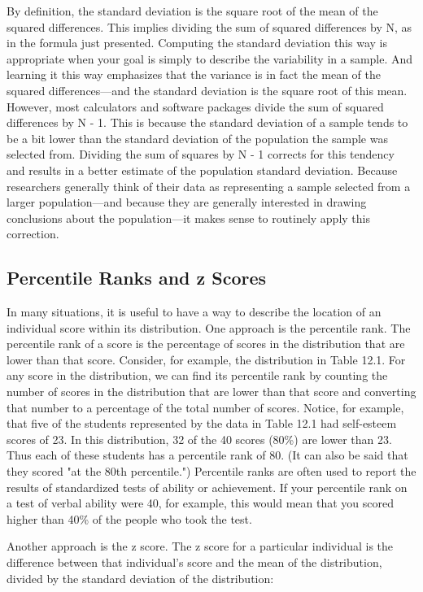 By definition, the standard deviation is the square root of the mean of the squared differences. This implies dividing the sum of squared differences by N, as in the formula just presented. Computing the standard deviation this way is appropriate when your goal is simply to describe the variability in a sample. And learning it this way emphasizes that the variance is in fact the mean of the squared differences---and the standard deviation is the square root of this mean.
However, most calculators and software packages divide the sum of squared differences by N - 1. This is because the standard deviation of a sample tends to be a bit lower than the standard deviation of the population the sample was selected from. Dividing the sum of squares by N - 1 corrects for this tendency and results in a better estimate of the population standard deviation. Because researchers generally think of their data as representing a sample selected from a larger population---and because they are generally interested in drawing conclusions about the population---it makes sense to routinely apply this correction.

\subsection{Percentile Ranks and z Scores}

In many situations, it is useful to have a way to describe the location of an individual score within its distribution. One approach is the percentile rank. The percentile rank of a score is the percentage of scores in the distribution that are lower than that score. Consider, for example, the distribution in Table 12.1. For any score in the distribution, we can find its percentile rank by counting the number of scores in the distribution that are lower than that score and converting that number to a percentage of the total number of scores. Notice, for example, that five of the students represented by the data in Table 12.1 had self-esteem scores of 23. In this distribution, 32 of the 40 scores (80\%) are lower than 23. Thus each of these students has a percentile rank of 80. (It can also be said that they scored "at the 80th percentile.") Percentile ranks are often used to report the results of standardized tests of ability or achievement. If your percentile rank on a test of verbal ability were 40, for example, this would mean that you scored higher than 40\% of the people who took the test.

Another approach is the z score. The z score for a particular individual is the difference between that individual's score and the mean of the distribution, divided by the standard deviation of the distribution:

